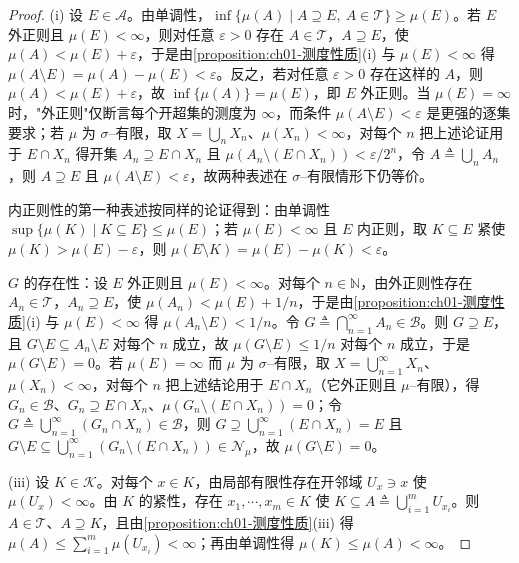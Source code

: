 \documentclass[../../main.tex]{subfiles}%
\begin{document}
\begin{proof}
(i) 设 $E\in\mathcal{A}$。由单调性，$\inf\{\mu(A)\mid A\supseteq E,\ A\in\mathcal{T}\}\geqslant\mu(E)$。若 $E$ 外正则且 $\mu(E)<\infty$，则对任意 $\varepsilon>0$ 存在 $A\in\mathcal{T}$，$A\supseteq E$，使 $\mu(A)<\mu(E)+\varepsilon$，于是由\cref{proposition:ch01-测度性质}(i) 与 $\mu(E)<\infty$ 得 $\mu(A\setminus E)=\mu(A)-\mu(E)<\varepsilon$。反之，若对任意 $\varepsilon>0$ 存在这样的 $A$，则 $\mu(A)<\mu(E)+\varepsilon$，故 $\inf\{\mu(A)\}=\mu(E)$，即 $E$ 外正则。当 $\mu(E)=\infty$ 时，"外正则"仅断言每个开超集的测度为 $\infty$，而条件 $\mu(A\setminus E)<\varepsilon$ 是更强的逐集要求；若 $\mu$ 为 $\sigma$--有限，取 $X=\bigcup_nX_n$、$\mu(X_n)<\infty$，对每个 $n$ 把上述论证用于 $E\cap X_n$ 得开集 $A_n\supseteq E\cap X_n$ 且 $\mu(A_n\setminus(E\cap X_n))<\varepsilon/2^n$，令 $A\triangleq\bigcup_nA_n$，则 $A\supseteq E$ 且 $\mu(A\setminus E)<\varepsilon$，故两种表述在 $\sigma$--有限情形下仍等价。

内正则性的第一种表述按同样的论证得到：由单调性 $\sup\{\mu(K)\mid K\subseteq E\}\leqslant\mu(E)$；若 $\mu(E)<\infty$ 且 $E$ 内正则，取 $K\subseteq E$ 紧使 $\mu(K)>\mu(E)-\varepsilon$，则 $\mu(E\setminus K)=\mu(E)-\mu(K)<\varepsilon$。

$G$ 的存在性：设 $E$ 外正则且 $\mu(E)<\infty$。对每个 $n\in\mathbb{N}$，由外正则性存在 $A_n\in\mathcal{T}$，$A_n\supseteq E$，使 $\mu(A_n)<\mu(E)+1/n$，于是由\cref{proposition:ch01-测度性质}(i) 与 $\mu(E)<\infty$ 得 $\mu(A_n\setminus E)<1/n$。令 $G\triangleq\bigcap_{n=1}^\infty A_n\in\mathcal{B}$。则 $G\supseteq E$，且 $G\setminus E\subseteq A_n\setminus E$ 对每个 $n$ 成立，故 $\mu(G\setminus E)\leqslant1/n$ 对每个 $n$ 成立，于是 $\mu(G\setminus E)=0$。若 $\mu(E)=\infty$ 而 $\mu$ 为 $\sigma$--有限，取 $X=\bigcup_{n=1}^\infty X_n$、$\mu(X_n)<\infty$，对每个 $n$ 把上述结论用于 $E\cap X_n$（它外正则且 $\mu$--有限），得 $G_n\in\mathcal{B}$、$G_n\supseteq E\cap X_n$、$\mu(G_n\setminus(E\cap X_n))=0$；令 $G\triangleq\bigcup_{n=1}^\infty(G_n\cap X_n)\in\mathcal{B}$，则 $G\supseteq\bigcup_{n=1}^\infty(E\cap X_n)=E$ 且 $G\setminus E\subseteq\bigcup_{n=1}^\infty(G_n\setminus(E\cap X_n))\in\mathcal{N}_\mu$，故 $\mu(G\setminus E)=0$。

(iii) 设 $K\in\mathcal{K}$。对每个 $x\in K$，由局部有限性存在开邻域 $U_x\ni x$ 使 $\mu(U_x)<\infty$。由 $K$ 的紧性，存在 $x_1,\cdots ,x_m\in K$ 使 $K\subseteq A\triangleq\bigcup_{i=1}^mU_{x_i}$。则 $A\in\mathcal{T}$、$A\supseteq K$，且由\cref{proposition:ch01-测度性质}(iii) 得 $\mu(A)\leqslant\sum_{i=1}^m\mu(U_{x_i})<\infty$；再由单调性得 $\mu(K)\leqslant\mu(A)<\infty$。


\end{proof}
\end{document}
